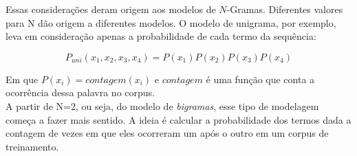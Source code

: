 Essas considerações deram origem aos modelos de $N$-Gramas. Diferentes valores para N dão origem a diferentes modelos. O modelo de unigrama, por exemplo, leva em consideração apenas a probabilidade de cada termo da sequência:

\begin{equation}
P_{uni}(x_1, x_2, x_3, x_4) = P(x_1)P(x_2)P(x_3)P(x_4)
\end{equation}

Em que $P(x_i) = contagem(x_i)$ e $contagem$ é uma função que conta a ocorrência dessa palavra no corpus.\\

A partir de N=2, ou seja, do modelo de \textit{bigramas}, esse tipo de modelagem começa a fazer mais sentido. A ideia é calcular a probabilidade dos termos dada a contagem de vezes em que eles ocorreram um após o outro em um corpus de treinamento.

